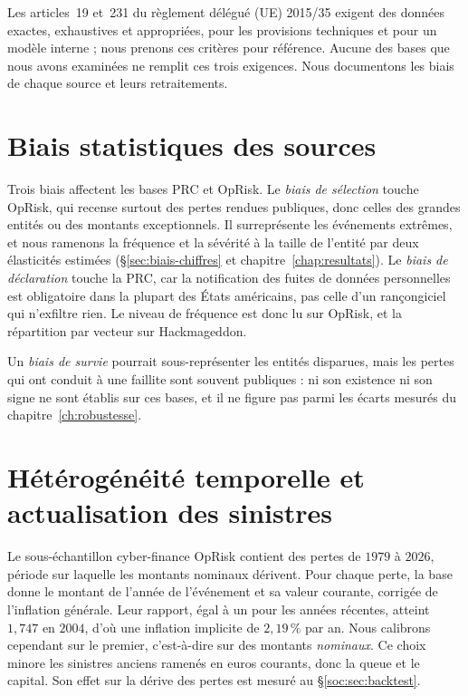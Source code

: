 Les articles~19 et~231 du règlement délégué (UE) 2015/35 exigent des données exactes, exhaustives et
appropriées, pour les provisions techniques et pour un modèle interne ; nous prenons ces critères pour référence. Aucune des bases que nous avons examinées ne remplit ces trois exigences. Nous documentons les biais de chaque source et leurs retraitements.


\section{Biais statistiques des sources}
\label{sec:trois-biais}

Trois biais affectent les bases PRC et OpRisk. Le
\emph{biais de sélection} touche OpRisk, qui recense surtout des pertes rendues publiques, donc
celles des grandes entités ou des montants exceptionnels. Il surreprésente les événements extrêmes,
et nous ramenons la fréquence et la sévérité à la taille de l'entité par deux élasticités estimées
(\S\ref{sec:biais-chiffres} et chapitre~\ref{chap:resultats}). Le \emph{biais de déclaration}
touche la PRC, car la notification des fuites de données personnelles est obligatoire dans la plupart
des États américains, pas celle d'un rançongiciel qui n'exfiltre rien. Le niveau de fréquence est
donc lu sur OpRisk, et la répartition par vecteur sur Hackmageddon.

Un \emph{biais de survie} pourrait sous-représenter les entités disparues, mais les pertes qui ont conduit à une faillite sont souvent publiques : ni son existence ni son signe ne sont établis sur ces bases, et il ne figure pas parmi les écarts mesurés du chapitre~\ref{ch:robustesse}.

\section{Hétérogénéité temporelle et actualisation des sinistres}

Le sous-échantillon cyber-finance OpRisk contient des pertes de $1979$ à $2026$, période sur laquelle les montants nominaux dérivent.
Pour chaque perte, la base donne le montant de l'année de l'événement et sa valeur courante, corrigée
de l'inflation générale. Leur rapport, égal à un pour les années récentes, atteint $1{,}747$ en
$2004$, d'où une inflation implicite de $2{,}19\,\%$ par an. Nous calibrons cependant sur le premier,
c'est-à-dire sur des montants \emph{nominaux}. Ce choix minore les sinistres anciens ramenés en euros
courants, donc la queue et le capital. Son effet sur la dérive des pertes est mesuré au
\S\ref{soc:sec:backtest}.

